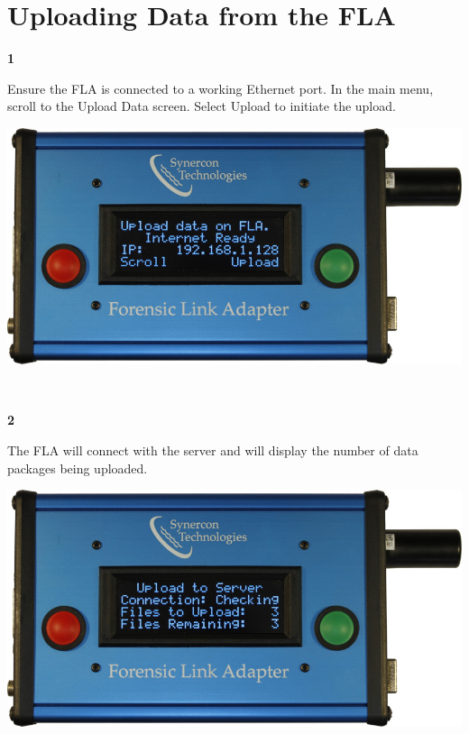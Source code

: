 \documentclass[11pt, oneside]{book}
\begin{document}
\section{Uploading Data from the FLA}
\label{subsec:upload_data}
\noindent\begin{minipage}{0.45\textwidth}%
\begin{center}
\textbf{1}\\[\baselineskip]
\end{center}
Ensure the FLA is connected to a working Ethernet port. In the main menu, scroll to the Upload Data screen. Select Upload to initiate the upload.
\end{minipage}%
\hfill%
\begin{minipage}{0.45\textwidth}
\includegraphics[width=\linewidth]{../media/fla_screens/ethernet_and_others/main/upload_data}
\end{minipage}
\\[\baselineskip]
\noindent\begin{minipage}{0.45\textwidth}%
\begin{center}
\textbf{2}\\[\baselineskip]
\end{center}
The FLA will connect with the server and will display the number of data packages being uploaded.
\end{minipage}%
\hfill%
\begin{minipage}{0.45\textwidth}
\includegraphics[width=\linewidth]{../media/fla_screens/ethernet_and_others/main/upload_data_checking}
\end{minipage}
\end{document}
